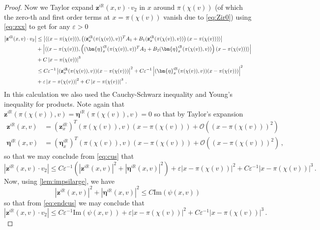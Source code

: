 \documentclass[
	fontsize=11pt, 
	twoside=false, 
	abstract=true, 
	a4paper,
]{scrartcl}
\newcommand{\eps}{\varepsilon}
\newcommand{\RR}{\mathbb{R}}
\newcommand{\abs}[1]{\left\lvert#1\right\rvert}
\begin{document}
\begin{proof}
	Now we Taylor expand $\mathbf{z}^{i\RR}(x,v)\cdot v_2$ in $x$ around $\pi(\chi(v))$ (of which the zero-th and first order terms at $x=\pi(\chi(v))$ vanish due to \cref{eq:Zir0}) using \cref{eq:zxx} to get for any $\eps>0$
	\begin{align}
		\abs{\mathbf{z}^{i\RR}(x,v)\cdot v_2} &\leq \abs{\langle (x-\pi(\chi(v))),\left((\mathbf{z}_x^{i\RR}(\pi(\chi(v)),v))^T A_1 + B_1(\mathbf{z}_x^{i\RR}(\pi(\chi(v)),v))\right)(x-\pi(\chi(v)))\rangle} \notag \\
&+ \abs{\langle (x-\pi(\chi(v))), \left((\bm{\eta}_x^{i\RR}(\pi(\chi(v)),v))^T A_2 + B_2 (\bm{\eta}_x^{i\RR}(\pi(\chi(v)),v))\right) (x-\pi(\chi(v)))\rangle} \notag \\ 
&+ C\abs{x-\pi(\chi(v))}^3 \notag \\
	&\leq C\varepsilon^{-1}\abs{(\mathbf{z}_x^{i\RR}(\pi(\chi(v)),v))(x-\pi(\chi(v)))}^2 + C\varepsilon^{-1}\abs{(\bm{\eta}_x^{i\RR}(\pi(\chi(v)),v))(x-\pi(\chi(v)))}^2\notag\\ 
	&+ \varepsilon\abs{x-\pi(\chi(v))}^2 + C\abs{x-\pi(\chi(v))}^3\,.\label{eq:cus}
	\end{align}
	In this calculation we also used the Cauchy-Schwarz inequality and Young's inequality for products. 
	Note again that $\mathbf{z}^{i\RR}(\pi(\chi(v)),v) = \bm{\eta}^{i{\RR}}(\pi(\chi(v)),v) = 0$ so that by Taylor's expansion
	\begin{equation*}
	\begin{aligned}%
		\mathbf{z}^{i\RR}(x,v) &= (\mathbf{z}_x^{i\RR})^T(\pi(\chi(v)),v) (x-\pi(\chi(v))) + \mathcal{O}((x-\pi(\chi(v)))^2)\\
		\bm{\eta}^{i\RR}(x,v) &= (\bm{\eta}_x^{i\RR})^T(\pi(\chi(v)),v) (x-\pi(\chi(v))) + \mathcal{O}((x-\pi(\chi(v)))^2)\,,
	\end{aligned}
	\end{equation*}
	so that we may conclude from \cref{eq:cus} that
	\begin{equation}\label{eq:endcus}
		\abs{\mathbf{z}^{i\RR}(x,v)\cdot v_2} \leq C\varepsilon^{-1}\left(\abs{\mathbf{z}^{i\RR}(x,v)}^2+\abs{\bm{\eta}^{i\RR}(x,v)}^2\right)+ \varepsilon\abs{x-\pi(\chi(v))}^2 + C\varepsilon^{-1}\abs{x-\pi(\chi(v))}^3\,.
	\end{equation}
	Now, using \cref{lem:impsilarge}, we have
	\[
		\abs{\mathbf{z}^{i\RR}(x,v)}^2+\abs{\bm{\eta}^{i\RR}(x,v)}^2 \leq C\mathrm{Im}(\psi(x,v))
	\]
	so that from \cref{eq:endcus} we may conclude that 
	\[
		\abs{\mathbf{z}^{i\RR}(x,v)\cdot v_2} \leq C\varepsilon^{-1}\mathrm{Im}(\psi(x,v))+\varepsilon\abs{x-\pi(\chi(v))}^2 + C\varepsilon^{-1}\abs{x-\pi(\chi(v))}^3\,.	
	\]
\end{proof}
\end{document}
